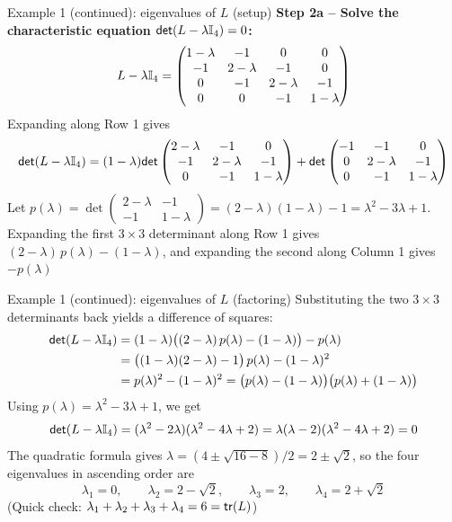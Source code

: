 \documentclass[aspectratio=169]{beamer}\usepackage[]{graphicx}\usepackage[]{xcolor}
\begin{document}
\begin{frame}{Example 1 (continued): eigenvalues of $L$ (setup)}
\textbf{Step 2a -- Solve the characteristic equation $\mathsf{det}(L - \lambda \mathbb{I}_4) = 0$:}
\[
L - \lambda \mathbb{I}_4 = \begin{pmatrix}
1 - \lambda & -1 & 0 & 0 \\
-1 & 2 - \lambda & -1 & 0 \\
0 & -1 & 2 - \lambda & -1 \\
0 & 0 & -1 & 1 - \lambda
\end{pmatrix}
\]
Expanding along Row 1 gives
\[
\mathsf{det}(L - \lambda \mathbb{I}_4)
= (1 - \lambda)\mathsf{det}\begin{pmatrix}
2 - \lambda & -1 & 0 \\
-1 & 2 - \lambda & -1 \\
0 & -1 & 1 - \lambda
\end{pmatrix}
+ \mathsf{det}\begin{pmatrix}
-1 & -1 & 0 \\
0 & 2 - \lambda & -1 \\
0 & -1 & 1 - \lambda
\end{pmatrix}
\]
\vfill
Let $p(\lambda) = \det\begin{pmatrix} 2-\lambda & -1 \\ -1 & 1-\lambda \end{pmatrix} = (2-\lambda)(1-\lambda) - 1 = \lambda^2 - 3\lambda + 1$.
Expanding the first $3\times 3$ determinant along Row 1 gives $(2-\lambda)\,p(\lambda) - (1-\lambda)$, and expanding the second along Column 1 gives $-p(\lambda)$
\end{frame}


\begin{frame}{Example 1 (continued): eigenvalues of $L$ (factoring)}
Substituting the two $3\times 3$ determinants back yields a difference of squares:
\begin{align*}
\mathsf{det}(L - \lambda \mathbb{I}_4) &= (1 - \lambda)\bigl((2 - \lambda)\,p(\lambda) - (1 - \lambda)\bigr) - p(\lambda) \\
&= \bigl((1 - \lambda)(2 - \lambda) - 1\bigr)\,p(\lambda) - (1 - \lambda)^2 \\
&= p(\lambda)^2 - (1 - \lambda)^2 = \bigl(p(\lambda) - (1 - \lambda)\bigr)\bigl(p(\lambda) + (1 - \lambda)\bigr)
\end{align*}
Using $p(\lambda) = \lambda^2 - 3\lambda + 1$, we get
\[
\mathsf{det}(L - \lambda \mathbb{I}_4) = (\lambda^2 - 2\lambda)(\lambda^2 - 4\lambda + 2) = \lambda(\lambda - 2)(\lambda^2 - 4\lambda + 2) = 0
\]
\vfill
The quadratic formula gives $\lambda = (4 \pm \sqrt{16 - 8})/2 = 2 \pm \sqrt{2}$, so the four eigenvalues in ascending order are
\[
\lambda_1 = 0, \qquad \lambda_2 = 2 - \sqrt{2}, \qquad \lambda_3 = 2, \qquad \lambda_4 = 2 + \sqrt{2}
\]
(Quick check: $\lambda_1 + \lambda_2 + \lambda_3 + \lambda_4 = 6 = \mathsf{tr}(L)$)
\end{frame}
\end{document}
